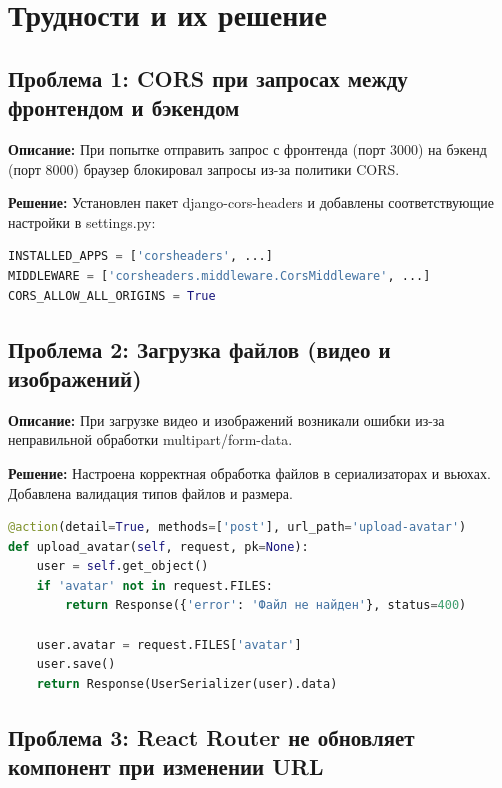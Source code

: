 \documentclass[12pt]{article}
\begin{document}
\newpage

\section{Трудности и их решение}

\subsection{Проблема 1: CORS при запросах между фронтендом и бэкендом}

\textbf{Описание:} При попытке отправить запрос с фронтенда (порт 3000) на бэкенд (порт 8000) браузер блокировал запросы из-за политики CORS.

\textbf{Решение:} Установлен пакет django-cors-headers и добавлены соответствующие настройки в settings.py:

\begin{lstlisting}[language=Python, caption=Настройка CORS]
INSTALLED_APPS = ['corsheaders', ...]
MIDDLEWARE = ['corsheaders.middleware.CorsMiddleware', ...]
CORS_ALLOW_ALL_ORIGINS = True
\end{lstlisting}

\subsection{Проблема 2: Загрузка файлов (видео и изображений)}

\textbf{Описание:} При загрузке видео и изображений возникали ошибки из-за неправильной обработки multipart/form-data.

\textbf{Решение:} Настроена корректная обработка файлов в сериализаторах и вьюхах. Добавлена валидация типов файлов и размера.

\begin{lstlisting}[language=Python, caption=Обработка загрузки аватара]
@action(detail=True, methods=['post'], url_path='upload-avatar')
def upload_avatar(self, request, pk=None):
    user = self.get_object()
    if 'avatar' not in request.FILES:
        return Response({'error': 'Файл не найден'}, status=400)
    
    user.avatar = request.FILES['avatar']
    user.save()
    return Response(UserSerializer(user).data)
\end{lstlisting}

\subsection{Проблема 3: React Router не обновляет компонент при изменении URL}
\end{document}
